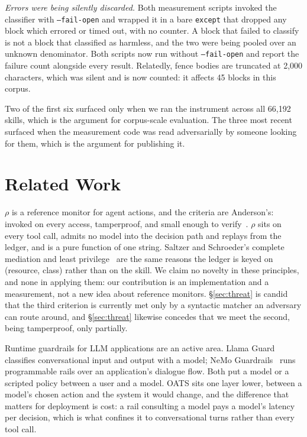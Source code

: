 \documentclass[10pt]{article}
\begin{document}
\emph{Errors were being silently discarded.} Both measurement scripts invoked the
classifier with \texttt{--fail-open} and wrapped it in a bare \texttt{except} that
dropped any block which errored or timed out, with no counter. A block that failed to
classify is not a block that classified as harmless, and the two were being pooled
over an unknown denominator. Both scripts now run without \texttt{--fail-open} and
report the failure count alongside every result. Relatedly, fence bodies are
truncated at 2{,}000 characters, which was silent and is now counted: it affects 45
blocks in this corpus.

Two of the first six surfaced only when we ran the instrument across all 66,192
skills, which is the argument for corpus-scale evaluation. The three most recent
surfaced when the measurement code was read adversarially by someone looking for
them, which is the argument for publishing it.

\section{Related Work}
\label{sec:related}

$\rho$ is a reference monitor for agent actions, and the criteria are Anderson's:
invoked on every access, tamperproof, and small enough to verify~\cite{anderson1972}.
$\rho$ sits on every tool call, admits no model into the decision path and replays
from the ledger, and is a pure function of one string. Saltzer and Schroeder's
complete mediation and least privilege~\cite{saltzer1975} are the same reasons the
ledger is keyed on (resource, class) rather than on the skill. We claim no novelty in
these principles, and none in applying them: our contribution is an implementation and
a measurement, not a new idea about reference monitors. \S\ref{sec:threat} is candid
that the third criterion is currently met only by a syntactic matcher an adversary can
route around, and \S\ref{sec:threat} likewise concedes that we meet the second, being
tamperproof, only partially.

Runtime guardrails for LLM applications are an active area. Llama
Guard~\cite{llamaguard2023} classifies conversational input and output with a model;
NeMo Guardrails~\cite{nemoguardrails2023} runs programmable rails over an application's
dialogue flow. Both put a model or a scripted policy between a user and a model. OATS
sits one layer lower, between a model's chosen action and the system it would change,
and the difference that matters for deployment is cost: a rail consulting a model pays
a model's latency per decision, which is what confines it to conversational turns
rather than every tool call.
\end{document}
